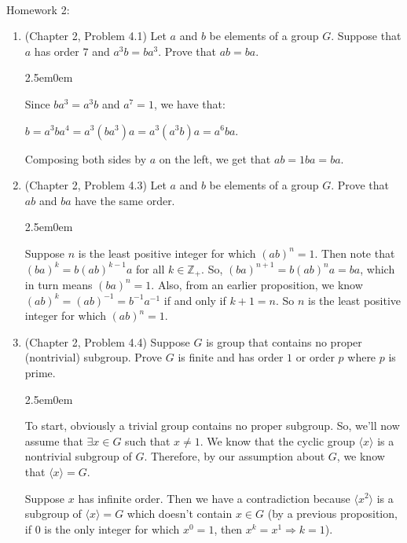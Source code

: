 \documentclass{book}
\newcommand{\exOne}{%
   \color{Purple}%
   \fontsize{13}{15}\selectfont%
}
\newenvironment{myIndent}{%
   \begin{adjustwidth}{2.5em}{0em}%
}{%
   \end{adjustwidth}%
}
\newcommand{\mySepTwo}[1][.]{%
   {\noindent\color{#1}{\rule{6.5in}{0.5mm}}}\\%
}
\newcommand{\retTwo}{\hfill\bigbreak}
\newcommand{\mHeader}[1]{{
   \color{Black}%
   \fontsize{20}{18}\selectfont%
   #1\retTwo
}}
\begin{document}
\mySepTwo

\mHeader{Homework 2:}


\begin{enumerate}
	\item (Chapter 2, Problem 4.1) Let $a$ and $b$ be elements of a group $G$. Suppose that $a$ has order $7$ and $a^3b = ba^3$. Prove that $ab = ba$.
	
	\begin{myIndent}\exOne
		Since $ba^3 = a^3b$ and $a^7 = 1$, we have that:
		
		{\centering $b = a^3ba^4 = a^3(ba^3)a = a^3(a^3b)a = a^6ba$. \retTwo\par}

		Composing both sides by $a$ on the left, we get that $ab = 1ba = ba$.\retTwo
	\end{myIndent}
	
	\item (Chapter 2, Problem 4.3) Let $a$ and $b$ be elements of a group $G$. Prove that $ab$ and $ba$ have the same order.
	
	\begin{myIndent}\exOne
		Suppose $n$ is the least positive integer for which $(ab)^n = 1$. Then note that\\ $(ba)^k = b(ab)^{k-1}a$ for all $k \in \mathbb{Z}_+$. So, $(ba)^{n+1} = b(ab)^na = ba$, which\\ in turn means $(ba)^n = 1$. Also, from an earlier proposition, we know\\ $(ab)^k = (ab)^{-1} = b^{-1}a^{-1}$ if and only if $k + 1 = n$. So $n$ is the least positive integer for which $(ab)^n = 1$.\retTwo
	\end{myIndent}

	\item (Chapter 2, Problem 4.4) Suppose $G$ is group that contains no proper (nontrivial) subgroup. Prove $G$ is finite and has order $1$ or order $p$ where $p$ is prime.
	
	\begin{myIndent}\exOne
		To start, obviously a trivial group contains no proper subgroup. So, we'll now assume that $\exists x \in G$ such that $x \neq 1$. We know that the cyclic group $\langle x \rangle$ is a nontrivial subgroup of $G$. Therefore, by our assumption about $G$, we know that $\langle x \rangle = G$.\newpage
		
		Suppose $x$ has infinite order. Then we have a contradiction because $\langle x^2 \rangle$ is a subgroup of $\langle x \rangle = G$ which doesn't contain $x \in G$ (by a previous proposition, if $0$ is the only integer for which $x^0 = 1$, then $x^k = x^1 \Rightarrow k = 1$).\retTwo


\end{myIndent}
\end{enumerate}
\end{document}
